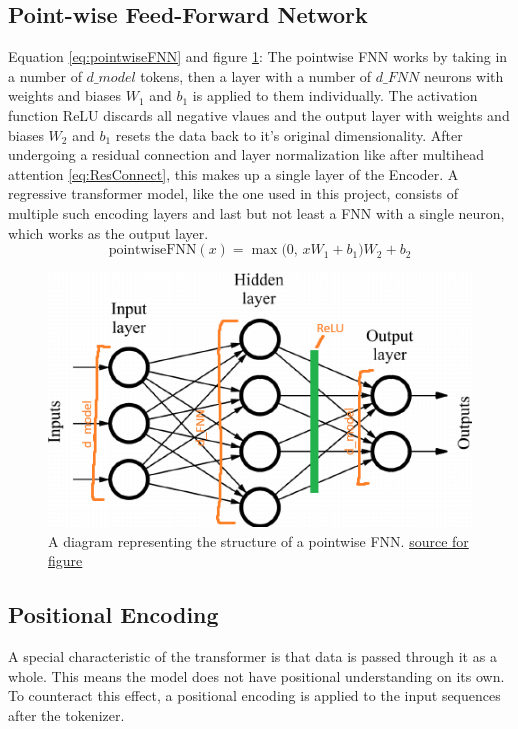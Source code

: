 \documentclass{article}
\begin{document}
\subsection{Point-wise Feed-Forward Network}
Equation \eqref{eq:pointwiseFNN} and figure \ref{fig:pointwiseFNN}:
The pointwise FNN works by taking in a number of $d\_model$ tokens, then a layer with a number of $d\_FNN$ neurons with weights and biases $W_1$ and $b_1$ is applied to them individually. The activation function ReLU discards all negative vlaues and the output layer with weights and biases $W_2$ and $b_1$ resets the data back to it's original dimensionality.
After undergoing a residual connection and layer normalization like after multihead attention \eqref{eq:ResConnect}, this makes up a single layer of the Encoder.
A regressive transformer model, like the one used in this project, consists of multiple such encoding layers and last but not least a FNN with a single neuron, which works as the output layer.
\begin{equation}
    \text{pointwiseFNN}(x) = \max\bigl(0, \, x W_1 + b_1 \bigr) W_2 + b_2 \label{eq:pointwiseFNN}
\end{equation}
\begin{figure}[htbp]
    \centering
    \includegraphics[width=0.4\paperwidth]{images/pointwiseFNN.png}
    \caption{A diagram representing the structure of a pointwise FNN. \href{https://datascience.stackexchange.com/questions/68020/what-is-the-feedforward-network-in-a-transformer-trained-on}{source for figure}}
    \label{fig:pointwiseFNN}
\end{figure}

\subsection{Positional Encoding}
A special characteristic of the transformer is that data is passed through it as a whole. This means the model does not have positional understanding on its own. To counteract this effect, a positional encoding is applied to the input sequences after the tokenizer.
\end{document}
